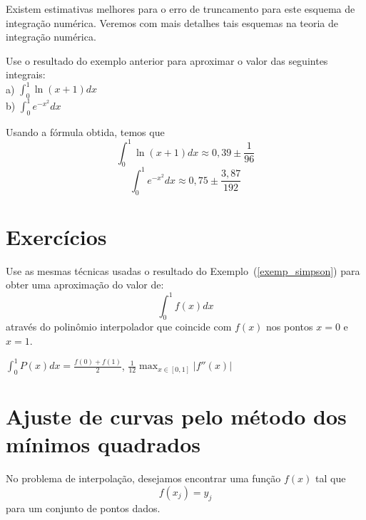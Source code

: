\documentclass[main.tex]{subfiles}
\begin{document}
\begin{obs}Existem estimativas melhores para o erro de truncamento para este esquema de integração numérica. Veremos com mais detalhes tais esquemas na teoria de integração numérica.
\end{obs}

\begin{ex}
Use o resultado do exemplo anterior para aproximar o valor das seguintes integrais:\\

a) $\displaystyle \int_0^1 \ln(x+1) dx$\\

b) $\displaystyle \int_0^1 e^{-x^2}dx$

\end{ex}
\begin{sol}
Usando a fórmula obtida, temos que
$$
\int_0^1\ln(x+1) dx \approx 0,39\pm \frac{1}{96}
$$
$$
\int_0^1 e^{-x^2} dx \approx 0,75\pm \frac{3,87}{192}
$$  
\end{sol}

\section*{Exercícios}

\begin{Exercise}
  Use as mesmas técnicas usadas o resultado do Exemplo~(\ref{exemp_simpson}) para obter uma aproximação do valor de:
  \begin{equation*}
    \int_0^1 f(x)dx
  \end{equation*}
através do polinômio interpolador que coincide com $f(x)$ nos pontos $x=0$ e $x=1$.
\end{Exercise}
\begin{Answer}
  \begin{tiny}
  $\int_0^1 P(x)dx =\frac{f(0)+f(1)}{2}$, $\frac{1}{12}\max_{x\in[0,1]}|f''(x)|$  
  \end{tiny}
\end{Answer}

\section{Ajuste de curvas pelo método dos mínimos quadrados}

No problema de interpolação, desejamos encontrar uma função $f(x)$ tal que
$$f(x_j)=y_j$$
para um conjunto de pontos dados.
\end{document}
